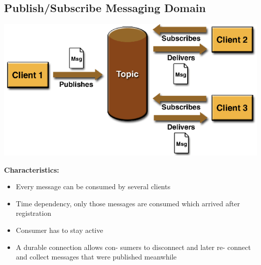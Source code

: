\documentclass[10pt]{article}
\begin{document}
\subsection{Publish/Subscribe Messaging Domain}
\begin{center}
	\includegraphics[scale=0.25]{jms-messaging-domain.png}
\end{center}
\textbf{Characteristics:}
\begin{itemize}
	\item Every message can be consumed by several clients
	\item Time dependency, only those messages are consumed which arrived after registration
	\item Consumer has to stay active
	\item A durable connection allows con- sumers to disconnect and later re- connect and collect messages that were published meanwhile
\end{itemize}
\end{document}
